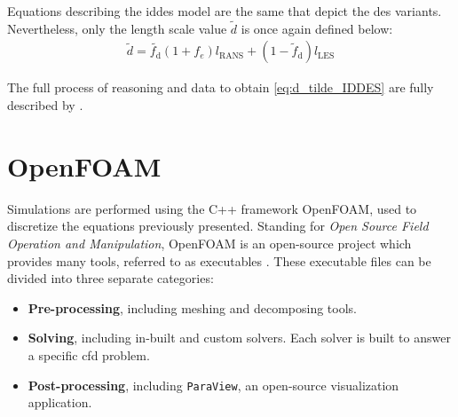 \documentclass[12pt,twoside]{report}
\begin{document}
Equations describing the \gls{iddes} model are the same that depict the \gls{des} variants. Nevertheless, only the length scale value $\tilde{d}$ is once again defined below:
\begin{align}
    \tilde{d} = \tilde{f_\mathrm{d}} \left( 1+f_e \right) l_\mathrm{RANS} + \left( 1- \tilde{f}_\mathrm{d} \right) l_\mathrm{LES} \label{eq:d_tilde_IDDES}
\end{align}

The full process of reasoning and data to obtain \autoref{eq:d_tilde_IDDES} are fully described by \cite{shur_hybrid_2008}. 

\clearpage

\section{OpenFOAM}
Simulations are performed using the C++ framework OpenFOAM, used to discretize the equations previously presented. Standing for \textsl{Open Source Field Operation and Manipulation}, OpenFOAM is an open-source project which provides many tools, referred to as executables \citep[see][]{greenshields2021}. These executable files can be divided into three separate categories:
\begin{itemize}
    \item[$-$] \textbf{Pre-processing}, including meshing and decomposing tools.
    \item[$-$] \textbf{Solving}, including in-built and custom solvers. Each solver is built to answer a specific \gls{cfd} problem. 
    \item[$-$] \textbf{Post-processing}, including \texttt{ParaView}, an open-source visualization application.
\end{itemize}
\end{document}
